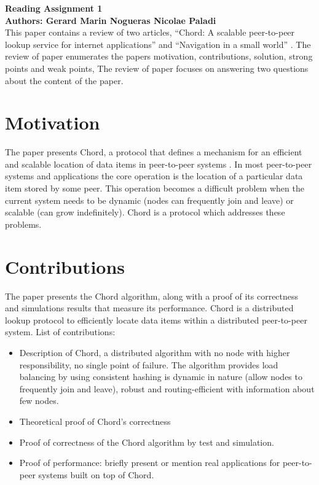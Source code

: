 \documentclass[10pt]{proc}
\begin{document}
\large{\textbf{Reading Assignment 1}}\\

\large{\textbf{Authors: Gerard Marin Nogueras \newline Nicolae Paladi}}\\

This paper contains a review of two articles, ``Chord: A scalable peer-to-peer lookup service for internet applications'' \cite{stoica2001chord} and ``Navigation in a small world'' \cite{kleinberg2000navigation}.
The review of paper \cite{stoica2001chord} enumerates the papers motivation, contributions, solution, strong points and weak points,
The review of paper \cite{kleinberg2000navigation} focuses on answering two questions about the content of the paper.


\section{Motivation}
The paper presents Chord, a protocol that defines a mechanism for an efficient and scalable location of data items in peer-to-peer systems \cite{stoica2001chord}. 
In most peer-to-peer systems and applications the core operation is the location of a particular data item stored by some peer. 
This operation becomes a difficult problem when the current system needs to be dynamic (nodes can frequently join and leave) or scalable (can grow indefinitely). 
Chord is a protocol which addresses these problems.


\section{Contributions}

The paper presents the Chord algorithm, along with a proof of its correctness and simulations results that measure its performance. 
Chord is a distributed lookup protocol to efficiently locate data items within a distributed peer-to-peer system. 
List of contributions:
\begin{itemize}
 \item Description of Chord, a distributed algorithm with no node with higher responsibility, no single point of failure. 
  The algorithm provides load balancing by using consistent hashing is dynamic in nature (allow nodes to frequently join and leave), robust and routing-efficient with information about few nodes.
 \item Theoretical proof of Chord’s correctness
 \item Proof of correctness of the Chord algorithm by test and simulation.
 \item Proof of performance: briefly present or mention real applications for peer-to-peer systems built on top of Chord.
\end{itemize}
\end{document}
